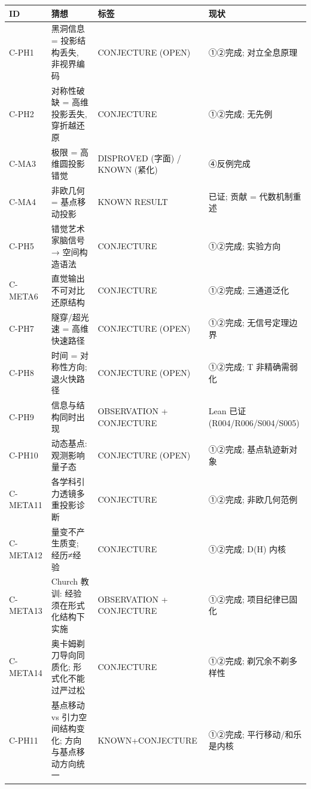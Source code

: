 \documentclass[
]{article}
\begin{document}
\begin{longtable}[]{@{}
  >{\raggedright\arraybackslash}p{}
  >{\raggedright\arraybackslash}p{}
  >{\raggedright\arraybackslash}p{}
  >{\raggedright\arraybackslash}p{}@{}}
\toprule\noalign{}
\begin{minipage}[b]{\linewidth}\raggedright
ID
\end{minipage} & \begin{minipage}[b]{\linewidth}\raggedright
猜想
\end{minipage} & \begin{minipage}[b]{\linewidth}\raggedright
标签
\end{minipage} & \begin{minipage}[b]{\linewidth}\raggedright
现状
\end{minipage} \\
\midrule\noalign{}
\endhead
\bottomrule\noalign{}
\endlastfoot
C-PH1 & 黑洞信息 = 投影结构丢失, 非视界编码 & CONJECTURE (OPEN) &
①②完成; 对立全息原理 \\
C-PH2 & 对称性破缺 = 高维投影丢失, 穿折越还原 & CONJECTURE & ①②完成;
无先例 \\
C-MA3 & 极限 = 高维圆投影错觉 & DISPROVED (字面) / KNOWN (紧化) &
④反例完成 \\
C-MA4 & 非欧几何 = 基点移动投影 & KNOWN RESULT & 已证; 贡献 =
代数机制重述 \\
C-PH5 & 错觉艺术家脑信号 → 空间构造语法 & CONJECTURE & ①②完成;
实验方向 \\
C-META6 & 直觉输出不可对比还原结构 & CONJECTURE & ①②完成; 三通道泛化 \\
C-PH7 & 隧穿/超光速 = 高维快速路径 & CONJECTURE (OPEN) & ①②完成;
无信号定理边界 \\
C-PH8 & 时间 = 对称性方向; 退火快路径 & CONJECTURE (OPEN) & ①②完成; T
非精确需弱化 \\
C-PH9 & 信息与结构同时出现 & OBSERVATION + CONJECTURE & Lean 已证
(R004/R006/S004/S005) \\
C-PH10 & 动态基点: 观测影响量子态 & CONJECTURE (OPEN) & ①②完成;
基点轨迹新对象 \\
C-META11 & 各学科引力透镜多重投影诊断 & CONJECTURE & ①②完成;
非欧几何范例 \\
C-META12 & 量变不产生质变; 经历≠经验 & CONJECTURE & ①②完成; D(H) 内核 \\
C-META13 & Church 教训: 经验须在形式化结构下实施 & OBSERVATION +
CONJECTURE & ①②完成; 项目纪律已固化 \\
C-META14 & 奥卡姆剃刀导向同质化; 形式化不能过严过松 & CONJECTURE &
①②完成; 剃冗余不剃多样性 \\
C-PH11 & 基点移动 vs 引力空间结构变化; 方向与基点移动方向统一 &
KNOWN+CONJECTURE & ①②完成; 平行移动/和乐是内核 \\
\end{longtable}
\end{document}

